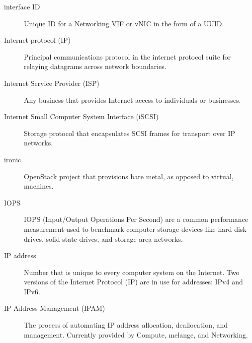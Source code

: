 \documentclass[letterpaper,10pt,english]{sphinxmanual}
\begin{document}
\begin{description}
\item[{interface ID}] \leavevmode{}\label{_source/glossary:term-interface-id}
Unique ID for a Networking VIF or vNIC in the form of a
UUID.

\item[{Internet protocol (IP)}] \leavevmode{}\label{_source/glossary:term-internet-protocol-ip}
Principal communications protocol in the internet protocol
suite for relaying datagrams across network boundaries.

\item[{Internet Service Provider (ISP)}] \leavevmode{}\label{_source/glossary:term-internet-service-provider-isp}
Any business that provides Internet access to individuals or
businesses.

\item[{Internet Small Computer System Interface (iSCSI)}] \leavevmode{}\label{_source/glossary:term-internet-small-computer-system-interface-iscsi}
Storage protocol that encapsulates SCSI frames for transport
over IP networks.

\item[{ironic}] \leavevmode{}\label{_source/glossary:term-ironic}
OpenStack project that provisions bare metal, as opposed to
virtual, machines.

\item[{IOPS}] \leavevmode{}\label{_source/glossary:term-iops}
IOPS (Input/Output Operations Per Second) are a common
performance measurement used to benchmark computer storage
devices like hard disk drives, solid state drives, and
storage area networks.

\item[{IP address}] \leavevmode{}\label{_source/glossary:term-ip-address}
Number that is unique to every computer system on the Internet.
Two versions of the Internet Protocol (IP) are in use for addresses:
IPv4 and IPv6.

\item[{IP Address Management (IPAM)}] \leavevmode{}\label{_source/glossary:term-ip-address-management-ipam}
The process of automating IP address allocation, deallocation,
and management. Currently provided by Compute, melange, and
Networking.


\end{description}
\end{document}
